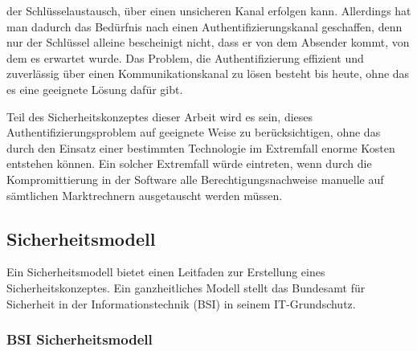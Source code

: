 \documentclass[11pt,a4paper]{report}
\begin{document}
der Schlüsselaustausch, über einen unsicheren Kanal erfolgen kann. Allerdings hat man dadurch das Bedürfnis nach einen Authentifizierungskanal geschaffen, denn nur der Schlüssel alleine bescheinigt nicht, dass er von dem Absender kommt, von dem es erwartet wurde. Das Problem, die Authentifizierung effizient und zuverlässig über einen Kommunikationskanal zu lösen besteht bis heute, ohne das es eine geeignete Lösung dafür gibt. 

Teil des Sicherheitskonzeptes dieser Arbeit wird es sein, dieses Authentifizierungsproblem auf geeignete Weise zu berücksichtigen, ohne das durch den Einsatz einer bestimmten Technologie im Extremfall enorme Kosten entstehen können. Ein solcher Extremfall würde eintreten, wenn durch die Kompromittierung in der Software alle Berechtigungsnachweise manuelle auf sämtlichen Marktrechnern ausgetauscht werden müssen. 

\subsection{Sicherheitsmodell}

Ein Sicherheitsmodell bietet einen Leitfaden zur Erstellung eines Sicherheitskonzeptes. Ein ganzheitliches Modell stellt das Bundesamt für Sicherheit in der Informationstechnik (BSI) in seinem IT-Grund\-schutz.  

\subsubsection{BSI Sicherheitsmodell}
\end{document}
